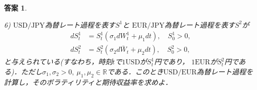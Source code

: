 \documentclass[11pt,a4paper]{jsarticle}
\theoremstyle{mystyle}
\newtheorem*{ans}{答案}
\begin{document}
\begin{ans}
\begin{itembox}[l]{6)}
	$\mbox{USD}/\mbox{JPY}$為替レート過程を表す$S^{1}$と
	$\mbox{EUR}/\mbox{JPY}$為替レート過程を表す$S^{2}$が
	\begin{align}
		dS^{1}_{t} &= S^{1}_{t}(\sigma_{1}dW^{1}_{t} + \mu_{1}dt), \quad S^{1}_{0} > 0, \\
		dS^{2}_{t} &= S^{2}_{t}(\sigma_{2}d\bar{W}_{t} + \mu_{2}dt), \quad S^{2}_{0} > 0, 
	\end{align}
	と与えられている(すなわち，時刻$t$で$1\mbox{USD}$が$S^{1}_{t}$円であり，
	$\mbox{1EUR}$が$S^{2}_{t}$円である)．ただし$\sigma_{1},\sigma_{2} > 0,\ 
	\mu_{1},\mu_{2} \in \mathbb{R}$である．このとき$\mbox{USD}/\mbox{EUR}$為替レート過程を
	計算し，そのボラティリティと期待収益率を求めよ．
\end{itembox}


\end{ans}
\end{document}
